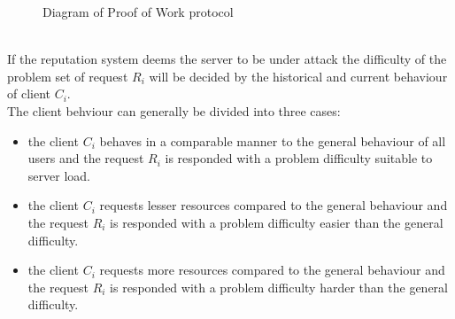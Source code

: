 \begin{figure}[H]
	\begin{center}
		\vspace{10pt}
		\caption{Diagram of Proof of Work protocol}\label{tab:protocol}
	\end{center}
\end{figure}
\\
If the reputation system deems the server to be under attack the difficulty of the problem set of request $R_i$ will be decided by the historical and current behaviour of client $C_i$. 
\\
The client behviour can generally be divided into three cases:
\begin{itemize}
\item the client $C_i$ behaves in a comparable manner to the general behaviour of all users and the request $R_i$ is responded with a problem difficulty suitable to server load.
\item the client $C_i$ requests lesser resources compared to the general behaviour and the request $R_i$ is responded with a problem difficulty easier than the general difficulty.
\item the client $C_i$ requests more resources compared to the general behaviour and the request $R_i$ is responded with a problem difficulty harder than the general difficulty.
\end{itemize}

